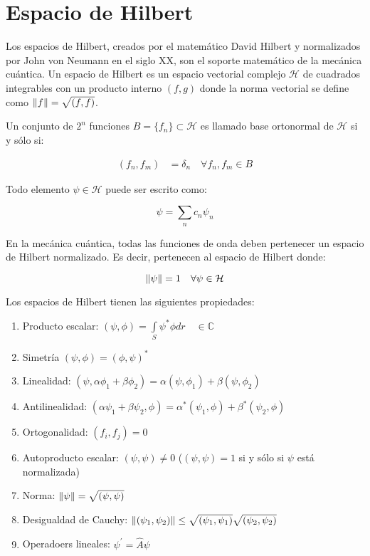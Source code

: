 \section{Espacio de Hilbert}

Los espacios de Hilbert, creados por el matemático David Hilbert y normalizados por John von Neumann en el siglo XX, son el soporte matemático de la mecánica cuántica. Un espacio de Hilbert es un espacio vectorial complejo $\mathcal{H}$ de cuadrados integrables con un producto interno $(f,g)$ donde la norma vectorial se define como $\norm{f} = \sqrt{(f,f)}$.

Un conjunto de $2^n$ funciones $B = \{f_n\} \subset \mathcal{H}$ es llamado base ortonormal de $\mathcal{H}$ si y sólo si:

\begin{align}
    (f_n, f_m) &= \delta_{n } \quad \forall f_n, f_m \in B
\end{align}

Todo elemento $\psi \in \mathcal{H}$ puede ser escrito como:

\begin{equation}
    \psi = \sum\limits_n c_n \psi_n
\end{equation}

En la mecánica cuántica, todas las funciones de onda deben pertenecer un espacio de Hilbert normalizado. Es decir, pertenecen al espacio de Hilbert donde:

\begin{equation}
    \norm{\psi} = 1 \quad \forall \psi \in \mathcal{H}
\end{equation}

Los espacios de Hilbert tienen las siguientes propiedades:

\begin{enumerate}
    \item Producto escalar: $(\psi, \phi) = \int\limits_S \psi^* \phi dr \quad \in \mathds{C}$
    \item Simetría $(\psi, \phi) = (\phi, \psi)^*$
    \item Linealidad: $(\psi, \alpha \phi_1 + \beta \phi_2) = \alpha (\psi, \phi_1) + \beta (\psi, \phi_2)$
    \item Antilinealidad: $(\alpha \psi_1 + \beta \psi_2, \phi) = \alpha^* (\psi_1, \phi) + \beta^* (\psi_2, \phi)$
    \item Ortogonalidad: $(f_i, f_j) = 0$
    \item Autoproducto escalar: $(\psi, \psi) \neq 0$ ($(\psi, \psi) = 1$ si y sólo si $\psi$ está normalizada)
    \item Norma: $\norm{\psi} = \sqrt{(\psi,\psi)}$
    \item Desigualdad de Cauchy: $\norm{(\psi_1,\psi_2)} \leq \sqrt{(\psi_1,\psi_1)} \sqrt{(\psi_2,\psi_2)}$
    \item Operadoers lineales: $\psi^\prime = \hat{A} \psi$
\end{enumerate}

